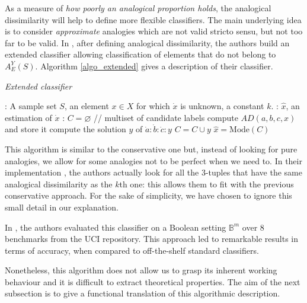 As a measure of \textit{how poorly an analogical proportion holds}, the
analogical dissimilarity will help to define more flexible classifiers.  The
main underlying idea is to consider {\it approximate} analogies which are not
valid stricto sensu, but not too far to be valid.
In \cite{BayMicDelIJCAI07}, after defining analogical dissimilarity,  the authors
build an extended classifier allowing classification of elements that do not
belong to $A_E^Y(S)$.  Algorithm \ref{algo_extended} gives a description of
their classifier.
\begin{algorithm}[!ht]
 \caption{\textit{Extended classifier}}
       \label{algo_extended}
       \begin{algorithmic}

      : A sample set $S$, an element $x \in X$ for which
      $\dot{x}$ is unknown, a constant $k$.
      : $\hat{x}$, an estimation of $\dot{x}$
      : $C = \varnothing$ \quad \quad // multiset of candidate labels
        \STATE compute $AD(a, b, c, x)$ and store it
	    \ENDFOR
      \STATE compute the solution $y$ of $\dot{a} : \dot{b} : \dot{c} : y$
      \STATE $C = C \cup y$
    \ENDFOR
    \STATE $\hat{x} = \text{Mode}(C)$
\end{algorithmic}
\end{algorithm}

This algorithm is similar to the conservative one but, instead of looking for
pure analogies, we allow for some analogies not to be perfect when we need to.
In their implementation \cite{BayMicDelIJCAI07}, the authors actually look for
all the 3-tuples that have the same analogical dissimilarity as the $k$th one:
this allows them to fit with the previous conservative approach. For the sake of
simplicity, we have chosen to
ignore this small detail in our explanation.

In \cite{BayMicDelIJCAI07}, the authors evaluated this classifier on a Boolean setting
$\mathbb{B}^m$ over 8 benchmarks from the UCI repository.  This approach led to
remarkable results in terms of accuracy, when compared to off-the-shelf
standard classifiers.

Nonetheless, this algorithm does not allow us to grasp its inherent working
behaviour and it is difficult to extract theoretical properties. The aim of the
next subsection is to give a functional translation of this algorithmic
description.


